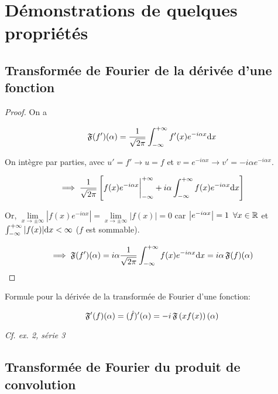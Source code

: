 \section{Démonstrations de quelques propriétés}

\subsection{Transformée de Fourier de la dérivée d'une fonction}

\begin{proof}
    On a
    
    \[
    \mathfrak{F}(f')(\alpha) =
    \frac{1}{\sqrt{2 \pi}} \int_{-\infty}^{+\infty} f'(x) e^{-i\alpha x} \mathrm{d}x
    \]
    
    On intègre par parties, avec $u' = f' \rightarrow u = f$ et $v = e^{-i\alpha x} \rightarrow v' = -i \alpha e^{-i\alpha x}$.
    
    \[
    \implies \frac{1}{\sqrt{2 \pi}} \left[
    f(x) e^{-i\alpha x} \bigg|_{-\infty}^{+\infty} +
    i\alpha \int_{-\infty}^{+\infty} f(x)e^{-i\alpha x} \mathrm{d}x
    \right]
    \]
    
    Or, $\lim\limits_{x \rightarrow \pm \infty} \left| f(x) e^{-i\alpha x}\right| = \lim\limits_{x \rightarrow \pm \infty} \left|f(x)\right| = 0$ car $\left|e^{-i\alpha x}\right| = 1 \enspace \forall x\in \mathbb{R}$ et $\int_{-\infty}^{+\infty} |f(x)| \mathrm{d}x < \infty$ ($f$ est sommable).
    
    \[
    \implies \mathfrak{F}(f')(\alpha) = i\alpha \frac{1}{\sqrt{2 \pi}} \int_{-\infty}^{+\infty} f(x) e^{-i\alpha x} \mathrm{d}x = i\alpha \, \mathfrak{F}(f)(\alpha)
    \]
\end{proof}

\begin{remark}
    Formule pour la dérivée de la transformée de Fourier d'une fonction:
    
    \[\mathfrak{F}'(f)(\alpha) = (\hat{f})'(\alpha) = -i \, \mathfrak{F}\left(xf(x)\right)(\alpha)\]
    
    \textit{Cf. ex. 2, série 3}
\end{remark}


\subsection{Transformée de Fourier du produit de convolution}

